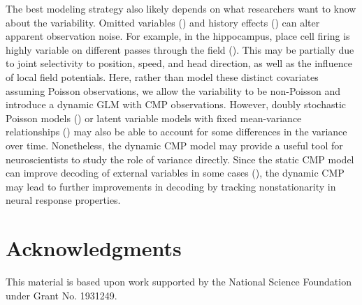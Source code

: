 \documentclass[]{article}
\begin{document}
	The best modeling strategy also likely depends on what researchers want to know about the variability. Omitted variables (\cite{Stevenson2018,Goris2014}) and history effects (\cite{Uzzell2004}) can alter apparent observation noise. For example, in the hippocampus, place cell firing is highly variable on different passes through the field (\cite{Fenton1998}). This may be partially due to joint selectivity to position, speed, and head direction, as well as the influence of local field potentials. Here, rather than model these distinct covariates assuming Poisson observations, we allow the variability to be non-Poisson and introduce a dynamic GLM with CMP observations. However, doubly stochastic Poisson models (\cite{Barbieri2001}) or latent variable models with fixed mean-variance relationships (\cite{Gao2015,Pillow2012}) may also be able to account for some differences in the variance over time. Nonetheless, the dynamic CMP model may provide a useful tool for neuroscientists to study the role of variance directly. Since the static CMP model can improve decoding of external variables in some cases (\cite{Ghanbari2019}), the dynamic CMP may lead to further improvements in decoding by tracking nonstationarity in neural response properties. 
	
	\section*{Acknowledgments}
	This material is based upon work supported by the National Science Foundation under Grant No. 1931249.
	
	
	
	
\end{document}
